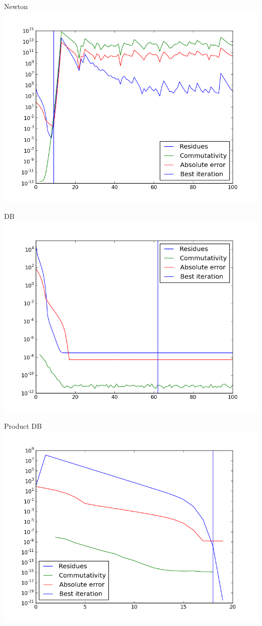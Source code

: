 \documentclass{beamer}
\theoremstyle{plain}
\theoremstyle{definition}
\theoremstyle{remark}
\begin{document}
\begin{frame}{Newton}
  \includegraphics[width=\textwidth,height=\textheight]{"moler/Newton - absplot"}
\end{frame}
\begin{frame}{DB}
  \includegraphics[width=\textwidth,height=\textheight]{"moler/DB - absplot"}
\end{frame}
\begin{frame}{Product DB}
  \includegraphics[width=\textwidth,height=\textheight]{"moler/Product DB - absplot"}
\end{frame}
\end{document}
